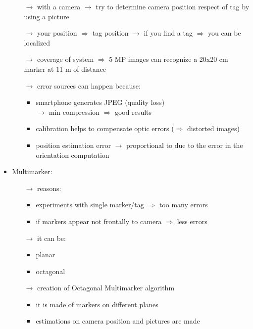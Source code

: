 \begin{itemize}
\begin{itemize}
        \item[$\rightarrow$] with a camera $\rightarrow$ try to determine camera position respect of tag by using a picture
        \item[$\rightarrow$] your position $\Rightarrow$ tag position $\rightarrow$ if you find a tag $\Rightarrow$ you can be localized
        \item[$\rightarrow$] coverage of system $\Rightarrow$ 5 MP images can recognize a 20x20 cm marker at 11 m of distance
        \item[$\rightarrow$] error sources can happen because:
        \begin{itemize}
            \item smartphone generates JPEG (quality loss)\\
            $\rightarrow$ min compression $\Rightarrow$ good results
            \item calibration helps to compensate optic errors ($\Rightarrow$ distorted images)
            \item position estimation error $\rightarrow$ proportional to due to the error in the orientation computation
        \end{itemize} 
    \end{itemize}
    \item Multimarker:
    \begin{itemize}
        \item[$\rightarrow$] reasons:
        \begin{itemize}
            \item experiments with single marker/tag $\Rightarrow$ too many errors
            \item if markers appear not frontally to camera $\Rightarrow$ less errors
        \end{itemize}
        \item[$\rightarrow$] it can be:
        \begin{itemize}
            \item planar
            \item octagonal
        \end{itemize}
        \item[$\rightarrow$] creation of Octagonal Multimarker algorithm
        \begin{itemize}
            \item it is made of markers on different planes
            \item estimations on camera position and pictures are made

\end{itemize}
\end{itemize}
\end{itemize}
